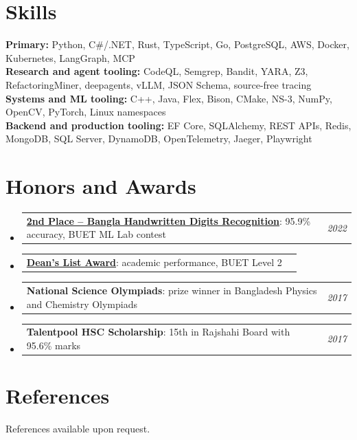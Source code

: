 \documentclass[a4paper,11pt]{article}
\makeatletter
\newcommand{\resumePOR}[3]{
\vspace{0.5mm}\item
    \begin{tabular*}{0.97\textwidth}[t]{l@{\extracolsep{\fill}}r}
        \textbf{#1}\hspace{0.3mm}#2 & \textit{\small{#3}} 
    \end{tabular*}
    \vspace{-2mm}
}
\newcommand{\resumeSubHeadingListStart}{\begin{itemize}[leftmargin=*,labelsep=1mm]}
\newcommand{\resumeSubHeadingListEnd}{\end{itemize}\vspace{2mm}}
\makeatother
\begin{document}
\vspace{-2mm}
\section{\textbf{Skills}}
\vspace{-0.4mm}
\small{
\textbf{Primary:} Python, C\#/.NET, Rust, TypeScript, Go, PostgreSQL, AWS, Docker, Kubernetes, LangGraph, MCP \\
\textbf{Research and agent tooling:} CodeQL, Semgrep, Bandit, YARA, Z3, RefactoringMiner, deepagents, vLLM, JSON Schema, source-free tracing \\
\textbf{Systems and ML tooling:} C++, Java, Flex, Bison, CMake, NS-3, NumPy, OpenCV, PyTorch, Linux namespaces \\
\textbf{Backend and production tooling:} EF Core, SQLAlchemy, REST APIs, Redis, MongoDB, SQL Server, DynamoDB, OpenTelemetry, Jaeger, Playwright
}
\vspace{-2mm}


\section{\textbf{Honors and Awards}}
\vspace{-0.4mm}
\resumeSubHeadingListStart

\resumePOR{\href{https://github.com/thromel/CSE-472-Machine-Learning}{2nd Place -- Bangla Handwritten Digits Recognition}}{: 95.9\% accuracy, BUET ML Lab contest}{2022}
\resumePOR{\href{https://cse.buet.ac.bd/academics/fund}{Dean's List Award}}{: academic performance, BUET Level 2}{}
\resumePOR{National Science Olympiads}{: prize winner in Bangladesh Physics and Chemistry Olympiads}{2017}
\resumePOR{Talentpool HSC Scholarship}{: 15th in Rajshahi Board with 95.6\% marks}{2017}

\resumeSubHeadingListEnd

\vspace{-6mm}

\section{\textbf{References}}
\vspace{-0.4mm}
\small{References available upon request.}
\vspace{-4mm}
\end{document}
